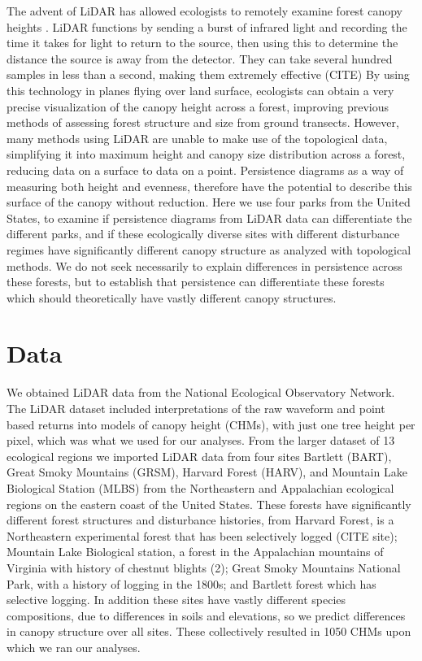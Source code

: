 \documentclass[10pt]{article}
\begin{document}
\indent The advent of LiDAR has allowed ecologists to remotely examine forest canopy heights . LiDAR functions by sending a burst of infrared light and recording the time it takes for light to return to the source, then using this to determine the distance the source is away from the detector. They can take several hundred samples in less than a second, making them extremely effective (CITE) By using this technology in planes flying over land surface, ecologists can obtain a very precise visualization of the canopy height across a forest, improving previous methods of assessing forest structure and size from ground transects. However, many methods using LiDAR are unable to make use of the topological data, simplifying it into maximum height and canopy size distribution across a forest, reducing data on a surface to data on a point. Persistence diagrams as a way of measuring both height and evenness, therefore have the potential to describe this surface of the canopy without reduction. Here we use four parks from the United States, to examine if persistence diagrams from LiDAR data can differentiate the different parks, and if these ecologically diverse sites with different disturbance regimes have significantly different canopy structure as analyzed with topological methods. We do not seek necessarily to explain differences in persistence across these forests, but to establish that persistence can differentiate these forests which should theoretically have vastly different canopy structures.


\section*{Data}
\indent We obtained LiDAR data from the National Ecological Observatory Network. The LiDAR dataset included interpretations of the raw waveform and point based returns into models of canopy height (CHMs), with just one tree height per pixel, which was what we used for our analyses. From the larger dataset of 13 ecological regions we imported LiDAR data from four sites Bartlett (BART), Great Smoky Mountains (GRSM), Harvard Forest (HARV), and Mountain Lake Biological Station (MLBS) from the Northeastern and Appalachian ecological regions on the eastern coast of the United States. These forests have significantly different forest structures and disturbance histories, from Harvard Forest, is a Northeastern experimental forest that has been selectively logged (CITE site); Mountain Lake Biological station, a forest in the Appalachian mountains of Virginia with history of chestnut blights (2); Great Smoky Mountains National Park, with a history of logging in the 1800s; and Bartlett forest which has selective logging. In addition these sites have vastly different species compositions, due to differences in soils and elevations, so we predict differences in canopy structure over all sites. These collectively resulted in 1050 CHMs upon which we ran our analyses.
\end{document}
